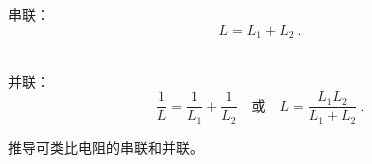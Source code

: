 
\begin{issues}
\issueDraft
\end{issues}


串联：
\begin{equation}
L = L_1 + L_2~.
\end{equation}
\

并联：
\begin{equation}
\frac{1}{L} = \frac{1}{L_1} + \frac{1}{L_2}
\quad \text{或} \quad
L = \frac{L_1L_2}{L_1 + L_2}~.
\end{equation}


推导可类比电阻的串联和并联。
